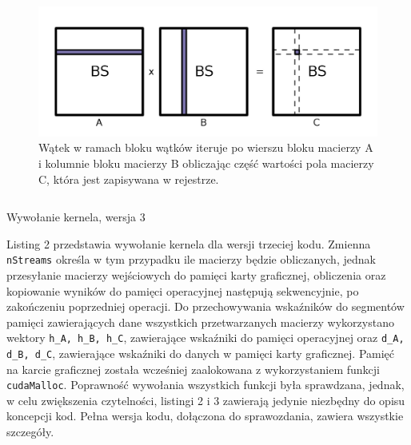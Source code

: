 \documentclass[12pt,a4paper]{article}
\begin{document}
\begin{figure}
  \includegraphics[width=\linewidth]{images/2.jpg}
  \caption{Wątek w ramach bloku wątków iteruje po wierszu bloku macierzy A i kolumnie bloku macierzy B obliczając część wartości pola macierzy C, która jest zapisywana w rejestrze.}
  \label{fig:matrix2}
\end{figure}

\begin{listing}[H]
\inputminted{cuda}{listings/invocation_sync.cu}
\caption{Wywołanie kernela, wersja 3}
\label{lst:sync}
\end{listing}

Listing 2 przedstawia wywołanie kernela dla wersji trzeciej kodu. Zmienna \verb|nStreams| określa w tym przypadku ile macierzy będzie obliczanych, jednak przesyłanie macierzy wejściowych do pamięci karty graficznej, obliczenia oraz kopiowanie wyników do pamięci operacyjnej następują sekwencyjnie, po zakończeniu poprzedniej operacji. Do przechowywania wskaźników do segmentów pamięci zawierających dane wszystkich przetwarzanych macierzy wykorzystano wektory \verb|h_A, h_B, h_C|, zawierające wskaźniki do pamięci operacyjnej oraz \verb|d_A, d_B, d_C|, zawierające wskaźniki do danych w pamięci karty graficznej. Pamięć na karcie graficznej została wcześniej zaalokowana z wykorzystaniem funkcji \verb|cudaMalloc|. Poprawność wywołania wszystkich funkcji była sprawdzana, jednak, w celu zwiększenia czytelności, listingi 2 i 3 zawierają jedynie niezbędny do opisu koncepcji kod. Pełna wersja kodu, dołączona do sprawozdania, zawiera wszystkie szczegóły.
\end{document}
